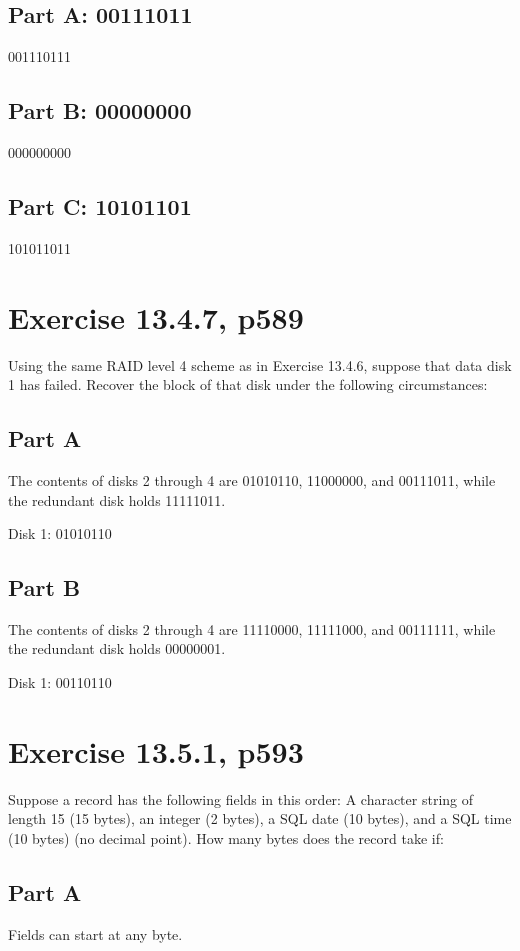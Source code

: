 \documentclass [a4paper,12pt] {article}
\begin{document}
    \subsection {Part A: 00111011}
        001110111
    \subsection {Part B: 00000000}
        000000000
    \subsection {Part C: 10101101}
        101011011

\section{Exercise 13.4.7, p589}
    Using the same RAID level  4 scheme as in Exercise 13.4.6, suppose that data 
    disk 1 has failed. Recover the block of that disk under the following 
    circumstances:
    \subsection {Part A}
        The contents of disks 2 through 4 are 01010110, 11000000, and 00111011,
        while the redundant disk holds 11111011.

        \vspace{.2in}

        Disk 1: 01010110
    \subsection {Part B}
        The contents of disks 2 through 4 are 11110000, 11111000, and 00111111,
        while the redundant disk holds 00000001.
    
        \vspace{.2in}

        Disk 1: 00110110
\section{Exercise 13.5.1, p593}
    Suppose a record has the following fields in this order: A character string 
    of length 15 (15 bytes), an integer (2 bytes), a SQL date (10 bytes), and 
    a SQL time (10 bytes) (no decimal point). How many bytes does the record take if:
    \subsection {Part A}
        Fields can start at any byte.
\end{document}
